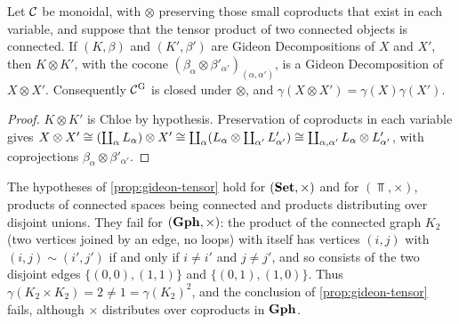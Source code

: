 \begin{proposition}\label{prop:gideon-tensor}
Let $\mathcal{C}$ be monoidal, with $\otimes$ preserving those small coproducts that exist
in each variable, and suppose that the tensor product of two connected objects
is connected. If $(K,\beta)$ and $(K',\beta')$ are Gideon Decompositions of $X$
and $X'$, then $K\otimes K'$, with the cocone
$(\beta_\alpha\otimes\beta'_{\alpha'})_{(\alpha,\alpha')}$, is a Gideon Decomposition of
$X\otimes X'$. Consequently $\mathcal{C}^{\mathrm{G}}$ is closed under $\otimes$, and
$\gamma(X\otimes X')=\gamma(X)\gamma(X')$.
\end{proposition}

\begin{proof}
$K\otimes K'$ is Chloe by hypothesis. Preservation of coproducts in each variable
gives $X\otimes X'\cong(\coprod_\alpha L_\alpha)\otimes X'\cong\coprod_\alpha(L_\alpha\otimes\coprod_{\alpha'}L'_{\alpha'})\cong\coprod_{\alpha,\alpha'}L_\alpha\otimes L'_{\alpha'}$,
with coprojections $\beta_\alpha\otimes\beta'_{\alpha'}$.
\end{proof}

\begin{example}\label{ex:gideon-tensor}
The hypotheses of \cref{prop:gideon-tensor} hold for $(\mathbf{Set},\times)$ and for
$(\Top,\times)$, products of connected spaces being connected and products
distributing over disjoint unions. They fail for $(\mathbf{Gph},\times)$: the product
of the connected graph $K_2$ (two vertices joined by an edge, no loops) with
itself has vertices $(i,j)$ with $(i,j)\sim(i',j')$ if and only if $i\neq i'$
and $j\neq j'$, and so consists of the two disjoint edges
$\{(0,0),(1,1)\}$ and $\{(0,1),(1,0)\}$. Thus $\gamma(K_2\times K_2)=2\neq1=\gamma(K_2)^2$,
and the conclusion of \cref{prop:gideon-tensor} fails, although $\times$ distributes
over coproducts in $\mathbf{Gph}$.
\end{example}
